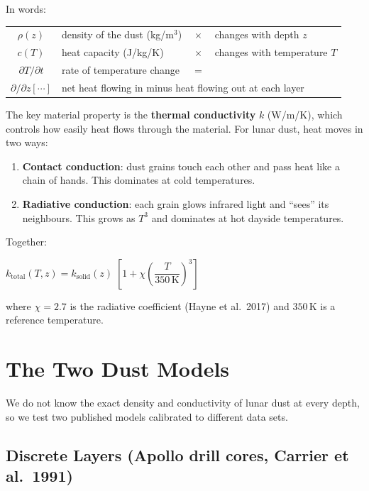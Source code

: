 \documentclass[12pt, a4paper]{article}
\newcommand{\eqbox}[1]{%
  \begin{center}
    \colorbox{boxgray}{\parbox{0.88\linewidth}{\vspace{4pt}\centering#1\vspace{4pt}}}
  \end{center}
}
\begin{document}
\noindent In words:

\begin{center}
\begin{tabular}{clcl}
  $\rho(z)$ & density of the dust (kg/m$^3$) & $\times$ & changes with depth $z$ \\
  $c(T)$    & heat capacity (J/kg/K)          & $\times$ & changes with temperature $T$ \\
  $\partial T/\partial t$ & rate of temperature change & $=$ & \\
  $\partial/\partial z[\cdots]$ & \multicolumn{3}{l}{net heat flowing in minus heat flowing out at each layer}
\end{tabular}
\end{center}

\vspace{0.5em}
The key material property is the \textbf{thermal conductivity} $k$ (W/m/K),
which controls how easily heat flows through the material.  For lunar dust,
heat moves in two ways:
\begin{enumerate}
  \item \textbf{Contact conduction}: dust grains touch each other and pass heat
        like a chain of hands.  This dominates at cold temperatures.
  \item \textbf{Radiative conduction}: each grain glows infrared light and
        ``sees'' its neighbours.  This grows as $T^3$ and dominates at hot
        dayside temperatures.
\end{enumerate}
Together:
\eqbox{
  $k_{\text{total}}(T,z) = k_{\text{solid}}(z)\;\left[1 + \chi\!\left(\dfrac{T}{350\,\text{K}}\right)^{\!3}\right]$
}

\noindent where $\chi = 2.7$ is the radiative coefficient (Hayne et al.\ 2017)
and $350\,\text{K}$ is a reference temperature.

\section{The Two Dust Models}

We do not know the exact density and conductivity of lunar dust at every depth,
so we test two published models calibrated to different data sets.

\subsection{Discrete Layers (Apollo drill cores, Carrier et al.\ 1991)}
\end{document}
